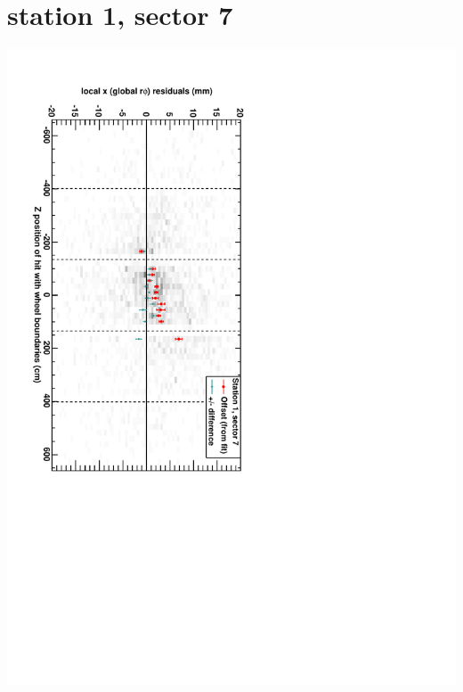 \documentclass[compress]{beamer}
\begin{document}
\section*{station 1, sector 7}
\begin{frame} \vfill \mbox{\hspace{-1 cm}\includegraphics[height=1.2\linewidth, angle=90]{DTrphiVsZ_st1_sr07.pdf}} \end{frame}
\end{document}
